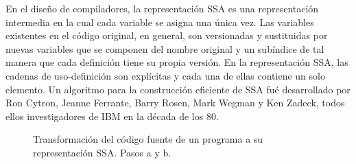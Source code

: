 En el diseño de compiladores, la representación SSA es una representación intermedia en la cual cada variable se asigna una única vez. Las variables existentes en el código original, en general, son versionadas y sustituidas por nuevas variables que se componen del nombre original y un subíndice de tal manera que cada definición tiene su propia versión. En la representación SSA, las cadenas de uso-definición son explícitas y cada una de ellas contiene un solo elemento.
Un algoritmo para la construcción eficiente de SSA fué desarrollado por Ron Cytron, Jeanne Ferrante, Barry Rosen, Mark Wegman y Ken Zadeck, todos ellos investigadores de IBM en la década de los 80.

\begin{figure}[t]
\begin{center}
\hspace{2em}
\caption{Transformación del código fuente de un programa a su representación SSA. Pasos a y b.}
\label{FIG:intro:ssa_ejemplo1}
\end{center}
\end{figure}
%

